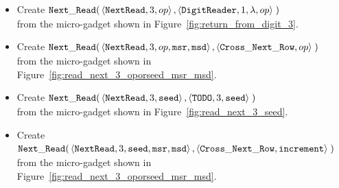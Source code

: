 \begin{itemize}

    \item Create
    $\begin{aligned}[t]
        {\tt Next\_Read}(& \left\langle {\tt NextRead},    3,          op \right\rangle,
                    \left\langle {\tt DigitReader}, 1, \lambda, op \right\rangle \;)
    \end{aligned}$\\from the micro-gadget shown in Figure~\ref{fig:return_from_digit_3}.

    \item Create
    $\begin{aligned}[t]
        {\tt Next\_Read}(& \left\langle {\tt NextRead}, 3, op, {\tt msr}, {\tt msd} \right\rangle,
                    \left\langle {\tt Cross\_Next\_Row}, op \right\rangle \;)
    \end{aligned}$\\from the micro-gadget shown in Figure~\ref{fig:read_next_3_oporseed_msr_msd}.

    \item Create
    $\begin{aligned}[t]
        {\tt Next\_Read}(& \left\langle {\tt NextRead}, 3, {\tt seed} \right\rangle,
                    \left\langle {\tt TODO},     3, {\tt seed} \right\rangle \;)
    \end{aligned}$\\from the micro-gadget shown in Figure~\ref{fig:read_next_3_seed}.

    \item Create
    $\begin{aligned}[t]
        {\tt Next\_Read}(& \left\langle {\tt NextRead}, 3, {\tt seed}, {\tt msr}, {\tt msd} \right\rangle,
                    \left\langle {\tt Cross\_Next\_Row}, {\tt increment}  \right\rangle \;)
    \end{aligned}$\\from the micro-gadget shown in Figure~\ref{fig:read_next_3_oporseed_msr_msd}.

\end{itemize}
